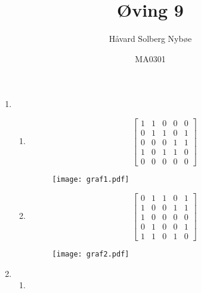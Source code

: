 \documentclass[a4paper, 12pt]{article}  %
\title{Øving 9}                         %
\author{Håvard Solberg Nybøe}           %
\date{MA0301}                           %
\begin{document}
\maketitle

\begin{enumerate}
    \item [\boxed{1}]
    \begin{enumerate}
        \item 
        \begin{equation*}
            \left[
                \begin{array}{ccccc}
                    1 & 1 & 0 & 0 & 0 \\
                    0 & 1 & 1 & 0 & 1 \\
                    0 & 0 & 0 & 1 & 1 \\
                    1 & 0 & 1 & 1 & 0 \\
                    0 & 0 & 0 & 0 & 0
                \end{array}
            \right]
        \end{equation*}
        \begin{figure}[h!]
            \centering
            \texttt{[image: graf1.pdf]}
        \end{figure}
        \newpage
        \item 
        \begin{equation*}
            \left[
                \begin{array}{ccccc}
                    0 & 1 & 1 & 0 & 1 \\
                    1 & 0 & 0 & 1 & 1 \\
                    1 & 0 & 0 & 0 & 0 \\
                    0 & 1 & 0 & 0 & 1 \\
                    1 & 1 & 0 & 1 & 0
                \end{array}
            \right]
        \end{equation*}
        \begin{figure}[h!]
            \centering
            \texttt{[image: graf2.pdf]}
        \end{figure}
    \end{enumerate}
    \item [\boxed{2}]
    \begin{enumerate}
        \item 
    \end{enumerate}
\end{enumerate}

\end{document}
